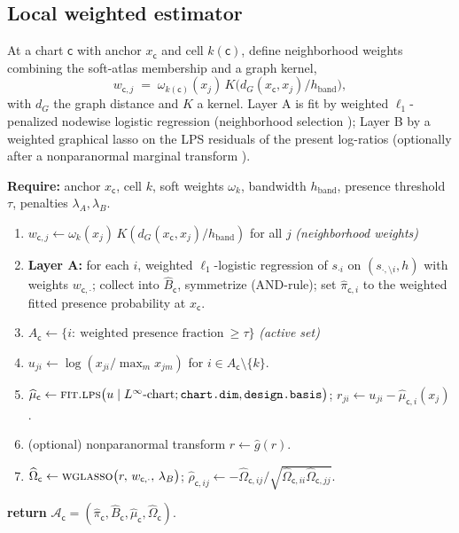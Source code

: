 \documentclass[11pt]{article}
\theoremstyle{definition}
\theoremstyle{plain}
\theoremstyle{remark}
\newcommand{\Linf}{L^{\infty}}
\newcommand{\1}{\mathbf{1}}
\newcommand{\Prec}{\Omega}
\newcommand{\Pres}{\pi}
\newcommand{\Edge}{B}
\newcommand{\Field}{\mathcal{A}}
\newcommand{\cc}{\mathsf{c}}              %
\begin{document}
\subsection{Local weighted estimator}\label{sec:localfit}
At a chart $\cc$ with anchor $x_\cc$ and cell $k(\cc)$, define neighborhood
weights combining the soft-atlas membership and a graph kernel,
\[
  w_{\cc,j}\;=\;\omega_{k(\cc)}(x_j)\,
       K\!\big(d_G(x_\cc,x_j)/h_{\mathrm{band}}\big),
\]
with $d_G$ the graph distance and $K$ a kernel. Layer A is fit by weighted
$\ell_1$-penalized nodewise logistic regression (neighborhood selection
\cite{ravikumar}); Layer B by a weighted graphical lasso \cite{glasso} on the
LPS residuals of the present log-ratios (optionally after a nonparanormal
marginal transform \cite{nonparanormal}).

\begin{algorithm}[t]
\caption{\textsc{LocalTwoLayerFit} --- association object at one chart}
\label{alg:local}
\textbf{Require:} anchor $x_\cc$, cell $k$, soft weights $\omega_k$, bandwidth
  $h_{\mathrm{band}}$, presence threshold $\tau$, penalties $\lambda_A,\lambda_B$.
\begin{enumerate}[label=\arabic*:,leftmargin=2.4em,topsep=2pt,itemsep=1pt]
\item $w_{\cc,j}\gets \omega_k(x_j)\,K(d_G(x_\cc,x_j)/h_{\mathrm{band}})$ for all
  $j$ \hfill\textit{(neighborhood weights)}
\item \textbf{Layer A:} for each $i$, weighted $\ell_1$-logistic regression of
  $s_{\cdot i}$ on $(s_{\cdot,\setminus i},h)$ with weights $w_{\cc,\cdot}$;
  collect into $\widehat\Edge_\cc$, symmetrize (AND-rule); set
  $\widehat\Pres_{\cc,i}$ to the weighted fitted presence probability at $x_\cc$.
\item $A_\cc\gets\{i:\ \text{weighted presence fraction}\ \ge\tau\}$
  \hfill\textit{(active set)}
\item $u_{ji}\gets\log(x_{ji}/\max_m x_{jm})$ for $i\in A_\cc\setminus\{k\}$.
\item $\widehat\mu_\cc\gets\textsc{fit.lps}\big(u \mid \Linf\text{-chart};
  \texttt{chart.dim},\texttt{design.basis}\big)$;\quad
  $r_{ji}\gets u_{ji}-\widehat\mu_{\cc,i}(x_j)$.
\item (optional) nonparanormal transform $r\gets \widehat g(r)$.
\item $\widehat\Prec_\cc\gets \textsc{wglasso}\big(r,\,w_{\cc,\cdot},\,
  \lambda_B\big)$;\quad
  $\widehat\rho_{\cc,ij}\gets -\widehat\Prec_{\cc,ij}/\sqrt{\widehat\Prec_{\cc,ii}\widehat\Prec_{\cc,jj}}$.
\end{enumerate}
\textbf{return} $\Field_\cc=(\widehat\Pres_\cc,\widehat\Edge_\cc,\widehat\mu_\cc,\widehat\Prec_\cc)$.
\end{algorithm}
\end{document}

